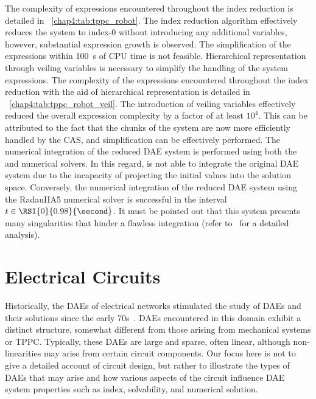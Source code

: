 The complexity of expressions encountered throughout the index reduction is detailed in \tablename{}~\ref{chap4:tab:tppc_robot}. The index reduction algorithm effectively reduces the system to index-0 without introducing any additional variables, however, substantial expression growth is observed. The simplification of the expressions within \SI{100}{\second} of \ac{CPU} time is not feasible. Hierarchical representation through veiling variables is necessary to simplify the handling of the system expressions. The complexity of the expressions encountered throughout the index reduction with the aid of hierarchical representation is detailed in \tablename{}~\ref{chap4:tab:tppc_robot_veil}. The introduction of veiling variables effectively reduced the overall expression complexity by a factor of at least $10^4$. This can be attributed to the fact that the chunks of the system are now more efficiently handled by the \ac{CAS}, and simplification can be effectively performed. The numerical integration of the reduced \ac{DAE} system is performed using both the \Maple{} and \Indigo{} numerical solvers. In this regard, \Maple{} is not able to integrate the original \ac{DAE} system due to the incapacity of projecting the initial values into the solution space. Conversely, the numerical integration of the reduced \ac{DAE} system using the RadauIIA5 \Indigo{} numerical solver is successful in the interval $t \in \RSI{0}{0.98}{\second}$. It must be pointed out that this system presents many singularities that hinder a flawless integration (refer to~\cite{schwarz2020singularities} for a detailed analysis).

\section{Electrical Circuits}
\label{chap4:sec:electrical_circuits}

Historically, the \acp{DAE} of electrical networks stimulated the study of \acp{DAE} and their solutions since the early 70s~\cite{gear1971simultaneous}. \acp{DAE} encountered in this domain exhibit a distinct structure, somewhat different from those arising from mechanical systems or \ac{TPPC}. Typically, these \acp{DAE} are large and sparse, often linear, although non-linearities may arise from certain circuit components. Our focus here is not to give a detailed account of circuit design, but rather to illustrate the types of \acp{DAE} that may arise and how various aspects of the circuit influence \ac{DAE} system properties such as index, solvability, and numerical solution.

